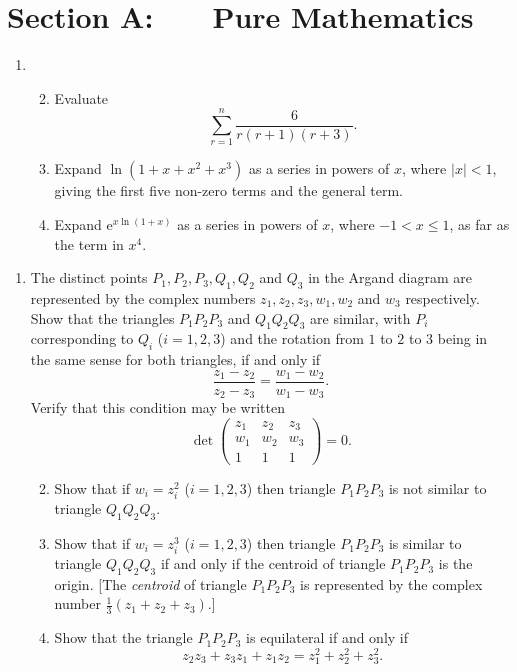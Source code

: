 \documentclass[a4, 11pt]{report}
\newlength{\qspace}
\newcounter{qnumber}
\newenvironment{question}%
 {\vspace{\qspace}
  \begin{enumerate}[\bfseries 1\quad][10]%
    \setcounter{enumi}{\value{qnumber}}%
    \item%
 }
{
  \end{enumerate}
  \filbreak
  \stepcounter{qnumber}
 }
\newenvironment{questionparts}[1][1]%
 {
  \begin{enumerate}[\bfseries (i)]%
    \setcounter{enumii}{#1}
    \addtocounter{enumii}{-1}
    \setlength{\itemsep}{5mm}
    \setlength{\parskip}{8pt}
 }
 {
  \end{enumerate}
 }
\begin{document}
\setcounter{page}{2}

 
\section*{Section A: \ \ \ Pure Mathematics}

\begin{question}
\begin{questionparts}
\item Evaluate 
\[
\sum_{r=1}^{n}\frac{6}{r(r+1)(r+3)}.
\]
\item Expand $\ln(1+x+x^{2}+x^{3})$ as a series in powers of $x$,
where $\left|x\right|<1$, giving the first five non-zero terms and
the general term. 
\item Expand $\mathrm{e}^{x\ln(1+x)}$ as a series in powers of $x$,
where $-1<x\leqslant1$, as far as the term in $x^{4}$. 
\end{questionparts}
\end{question}

\begin{question}
The distinct points $P_{1},P_{2},P_{3},Q_{1},Q_{2}$ and $Q_{3}$
in the Argand diagram are represented by the complex numbers $z_{1},z_{2},z_{3},w_{1},w_{2}$
and $w_{3}$ respectively. Show that the triangles $P_{1}P_{2}P_{3}$
and $Q_{1}Q_{2}Q_{3}$ are similar, with $P_{i}$ corresponding to
$Q_{i}$ ($i=1,2,3$) and the rotation from $1$ to $2$ to $3$ being
in the same sense for both triangles, if and only if 
\[
\frac{z_{1}-z_{2}}{z_{2}-z_{3}}=\frac{w_{1}-w_{2}}{w_{1}-w_{3}}.
\]
Verify that this condition may be written 
\[
\det\begin{pmatrix}z_{1} & z_{2} & z_{3}\\
w_{1} & w_{2} & w_{3}\\
1 & 1 & 1
\end{pmatrix}=0.
\]
\begin{questionparts}
\item Show that if $w_{i}=z_{i}^{2}$ ($i=1,2,3$) then triangle
$P_{1}P_{2}P_{3}$ is not similar to triangle $Q_{1}Q_{2}Q_{3}.$ 
\item Show that if $w_{i}=z_{i}^{3}$ ($i=1,2,3$) then triangle
$P_{1}P_{2}P_{3}$ is similar to triangle $Q_{1}Q_{2}Q_{3}$ if and
only if the centroid of triangle $P_{1}P_{2}P_{3}$ is the origin. 
{[}The \textit{centroid }of triangle $P_{1}P_{2}P_{3}$ is represented
by the complex number $\frac{1}{3}(z_{1}+z_{2}+z_{3})$.{]} 
\item Show that the triangle $P_{1}P_{2}P_{3}$ is equilateral if
and only if 
\[
z_{2}z_{3}+z_{3}z_{1}+z_{1}z_{2}=z_{1}^{2}+z_{2}^{2}+z_{3}^{2}.
\]
\end{questionparts}
\end{question}
\end{document}
